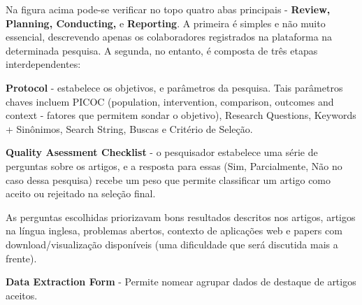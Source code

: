 \bigskip

Na figura acima pode-se verificar no topo quatro abas principais - \textbf{Review, Planning, Conducting, }e \textbf{Reporting}. A primeira é simples e não muito essencial, descrevendo apenas os colaboradores registrados na plataforma na determinada pesquisa. A segunda, no entanto, é composta de três etapas interdependentes:

\begin{alineas}

\item \textbf{Protocol} - estabelece os objetivos, e parâmetros da pesquisa. Tais parâmetros chaves incluem PICOC (population, intervention, comparison, outcomes and context - fatores que permitem sondar o objetivo), Research Questions, Keywords + Sinônimos, Search String, Buscas e Critério de Seleção.

\item \textbf{Quality Asessment Checklist} - o pesquisador estabelece uma série de perguntas sobre os artigos, e a resposta para essas (Sim, Parcialmente, Não no caso dessa pesquisa) recebe um peso que permite classificar um artigo como aceito ou rejeitado na seleção final. 

As perguntas escolhidas priorizavam bons resultados descritos nos artigos, artigos na língua inglesa, problemas abertos, contexto de aplicações web e papers com download/visualização disponíveis (uma dificuldade que será discutida mais a frente).

\item \textbf{Data Extraction Form} - Permite nomear agrupar dados de destaque de artigos aceitos.

\end{alineas}

